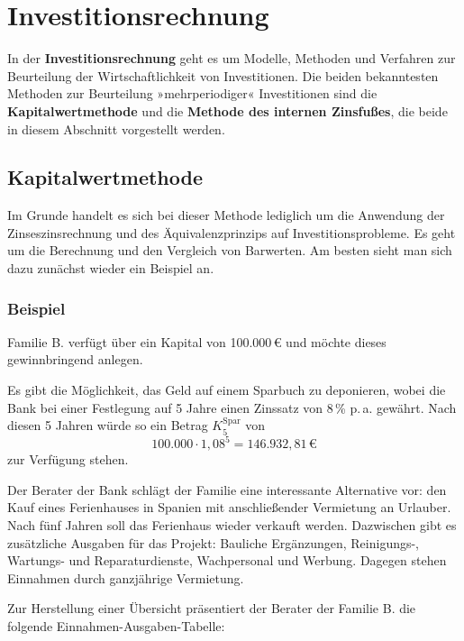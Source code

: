 \section{Investitionsrechnung}

In der \textbf{Investitionsrechnung} geht es um Modelle, Methoden und Verfahren zur Beurteilung der Wirtschaftlichkeit von Investitionen. Die beiden bekanntesten Methoden zur Beurteilung »mehrperiodiger« Investitionen sind die \textbf{Kapitalwertmethode} und die \textbf{Methode des internen Zinsfußes}, die beide in diesem Abschnitt vorgestellt werden.

\subsection{Kapitalwertmethode}

Im Grunde handelt es sich bei dieser Methode lediglich um die Anwendung der Zinseszinsrechnung und des Äquivalenzprinzips auf Investitionsprobleme. Es geht um die Berechnung und den Vergleich von Barwerten. Am besten sieht man sich dazu zunächst wieder ein Beispiel an.

\subsubsection{Beispiel}

Familie B. verfügt über ein Kapital von 100.000\,€ und möchte dieses gewinnbringend anlegen.

Es gibt die Möglichkeit, das Geld auf einem Sparbuch zu deponieren, wobei die Bank bei einer Festlegung auf 5 Jahre einen Zinssatz von 8\,\% p.\,a. gewährt. Nach diesen 5 Jahren würde so ein Betrag $K_5^{\text{Spar}}$ von
\[ 100.000 \cdot 1{,}08^5 = 146.932{,}81\,€ \]
zur Verfügung stehen.

Der Berater der Bank schlägt der Familie eine interessante Alternative vor: den Kauf eines Ferienhauses in Spanien mit anschließender Vermietung an Urlauber. Nach fünf Jahren soll das Ferienhaus wieder verkauft werden. Dazwischen gibt es zusätzliche Ausgaben für das Projekt: Bauliche Ergänzungen, Reinigungs-, Wartungs- und Reparaturdienste, Wachpersonal und Werbung. Dagegen stehen Einnahmen durch ganzjährige Vermietung.

Zur Herstellung einer Übersicht präsentiert der Berater der Familie B. die folgende Einnahmen-Ausgaben-Tabelle:

